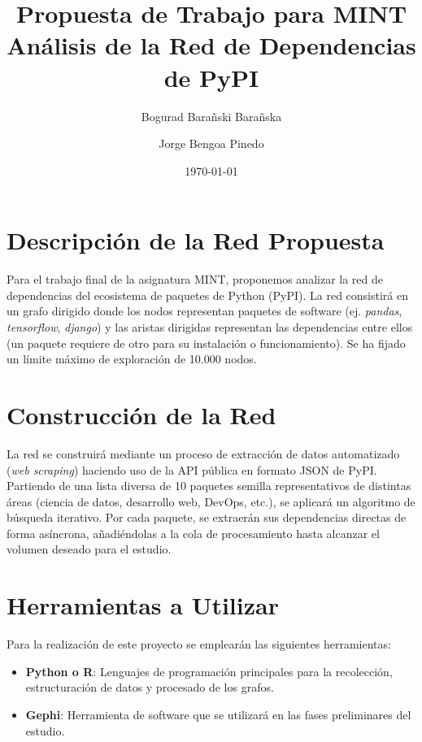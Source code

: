 \documentclass[12pt,a4paper]{article}
\title{\textbf{Propuesta de Trabajo para MINT}\\
	Análisis de la Red de Dependencias de PyPI}
\author{Bogurad Barañski Barañska \and Jorge Bengoa Pinedo}
\date{\today}
\begin{document}
	
	\maketitle
	
	\section{Descripción de la Red Propuesta}
	Para el trabajo final de la asignatura MINT, proponemos analizar la red de dependencias del ecosistema de paquetes de Python (PyPI). La red consistirá en un grafo dirigido donde los nodos representan paquetes de software (ej. \textit{pandas}, \textit{tensorflow}, \textit{django}) y las aristas dirigidas representan las dependencias entre ellos (un paquete requiere de otro para su instalación o funcionamiento). Se ha fijado un límite máximo de exploración de 10.000 nodos.
	
	\section{Construcción de la Red}
	La red se construirá mediante un proceso de extracción de datos automatizado (\textit{web scraping}) haciendo uso de la API pública en formato JSON de PyPI. Partiendo de una lista diversa de 10 paquetes semilla representativos de distintas áreas (ciencia de datos, desarrollo web, DevOps, etc.), se aplicará un algoritmo de búsqueda iterativo. Por cada paquete, se extraerán sus dependencias directas de forma asíncrona, añadiéndolas a la cola de procesamiento hasta alcanzar el volumen deseado para el estudio.
	
	\section{Herramientas a Utilizar}
	Para la realización de este proyecto se emplearán las siguientes herramientas:
	\begin{itemize}
		\item \textbf{Python o R}: Lenguajes de programación principales para la recolección, estructuración de datos y procesado de los grafos.
		\item \textbf{Gephi}: Herramienta de software que se utilizará en las fases preliminares del estudio.
	\end{itemize}
	
\end{document}
